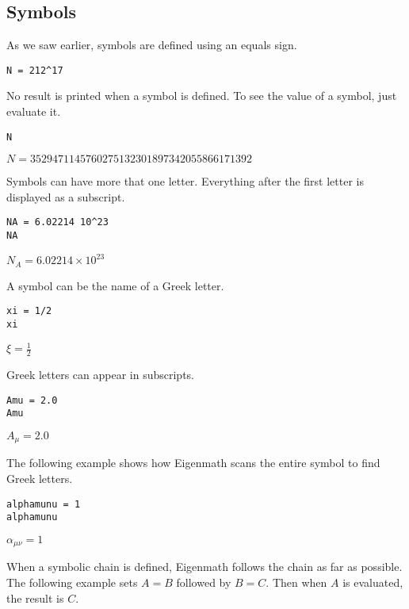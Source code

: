 \subsection{Symbols}

As we saw earlier, symbols are defined using an equals sign.

\begin{Verbatim}[formatcom=\color{blue}]
N = 212^17
\end{Verbatim}

\noindent
No result is printed when a symbol is defined.
To see the value of a symbol, just evaluate it.

\begin{Verbatim}[formatcom=\color{blue}]
N
\end{Verbatim}

\noindent
$\displaystyle N=3529471145760275132301897342055866171392$

\bigskip
\noindent
Symbols can have more that one letter.
Everything after the first letter is displayed as a subscript.

\begin{Verbatim}[formatcom=\color{blue}]
NA = 6.02214 10^23
NA
\end{Verbatim}

\noindent
$\displaystyle N_A=6.02214\times10^{23}$

\bigskip
\noindent
A symbol can be the name of a Greek letter.

\begin{Verbatim}[formatcom=\color{blue}]
xi = 1/2
xi
\end{Verbatim}

\noindent
$\displaystyle \xi=\tfrac{1}{2}$

\bigskip
\noindent
Greek letters can appear in subscripts.

\begin{Verbatim}[formatcom=\color{blue}]
Amu = 2.0
Amu
\end{Verbatim}

\noindent
$\displaystyle A_\mu=2.0$

\bigskip
\noindent
The following example shows how
Eigenmath scans the entire symbol to find Greek letters.

\begin{Verbatim}[formatcom=\color{blue}]
alphamunu = 1
alphamunu
\end{Verbatim}

\noindent
$\displaystyle \alpha_{\mu\nu}=1$

\bigskip
\noindent
When a symbolic chain is defined,
Eigenmath follows the chain as far as possible.
The following example sets $A=B$ followed by $B=C$.
Then when $A$ is evaluated, the result is $C$.

